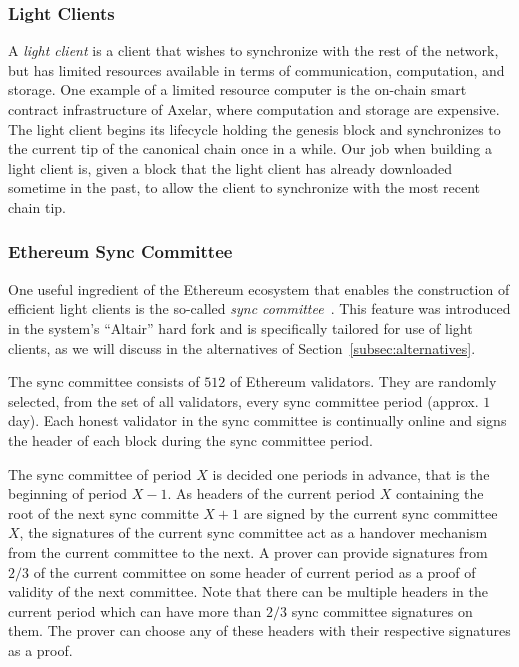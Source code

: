 \subsubsection{Light Clients}

A \emph{light client} is a client that wishes to synchronize with the rest
of the network, but has limited resources available in terms of communication,
computation, and storage. One example of a limited resource computer is the
on-chain smart contract infrastructure of Axelar, where computation and storage
are expensive. The light client begins its lifecycle holding the genesis block
and synchronizes to the current tip of the canonical chain once in a while.
Our job when building a light client is, given a block that the light client
has already downloaded sometime in the past, to allow the client to
synchronize with the most recent chain tip.

\subsubsection{Ethereum Sync Committee}\label{subsec:sync-committee}

One useful ingredient of the Ethereum ecosystem that enables the
construction of efficient light clients is the so-called \emph{sync committee}~\cite{sync-committee}.
This feature was introduced in the system's
``Altair'' hard fork and is specifically tailored for use of light clients, as
we will discuss in the alternatives of Section~\ref{subsec:alternatives}.

The sync committee consists of $512$ of Ethereum validators. They are randomly
selected, from the set of all validators, every sync committee period (approx.
$1$ day). Each honest validator in the sync committee is continually online and
signs the header of each block during the sync committee period.

The sync committee of period $X$ is decided one periods in advance,
that is the beginning of period $X-1$. As headers of the current period $X$ 
containing the root of the next sync committe $X+1$ are signed by the current
sync committee $X$, the signatures of the current sync committee act as a 
handover mechanism from the current committee to the next. A prover can 
provide signatures from $2/3$ of the current committee on some header of 
current period as a proof of validity of the next committee. Note that there
can be multiple headers in the current period which can have more than $2/3$
sync committee signatures on them. The prover can choose any of these headers
with their respective signatures as a proof.

